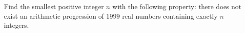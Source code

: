 Find the smallest positive integer $n$ with the following property: there does not exist an arithmetic progression of $1999$ real numbers containing exactly $n$ integers.
